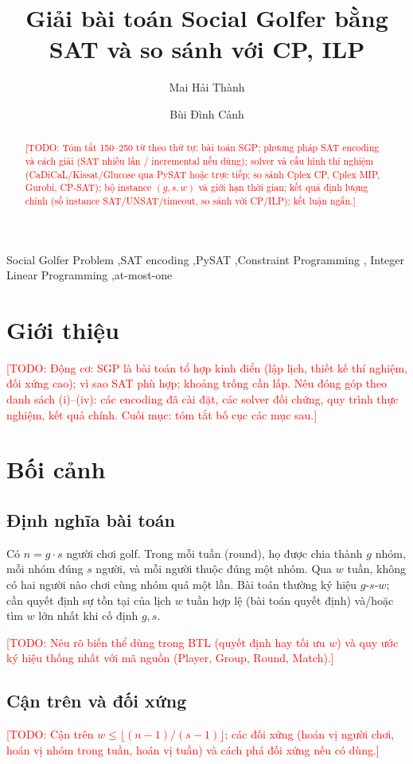 \documentclass[a4paper,fleqn]{cas-sc}
\title[mode=title]{Giải bài toán Social Golfer bằng SAT và so sánh với CP, ILP}
\author[1]{Mai Hải Thành}
\author[1]{Bùi Đình Cảnh}
\newcommand{\TODO}[1]{\textcolor{red}{[TODO: #1]}}
\begin{document}
\begin{abstract}
\TODO{Tóm tắt 150--250 từ theo thứ tự: bài toán SGP; phương pháp SAT encoding và
cách giải (SAT nhiều lần / incremental nếu dùng); solver và cấu hình thí nghiệm
(CaDiCaL/Kissat/Glucose qua PySAT hoặc trực tiếp; so sánh Cplex CP, Cplex MIP,
Gurobi, CP-SAT); bộ instance $(g,s,w)$ và giới hạn thời gian; kết quả định lượng
chính (số instance SAT/UNSAT/timeout, so sánh với CP/ILP); kết luận ngắn.}
\end{abstract}

\begin{keywords}
Social Golfer Problem \sep SAT encoding \sep PySAT \sep Constraint Programming \sep
Integer Linear Programming \sep at-most-one
\end{keywords}

\maketitle

\section{Giới thiệu}
\TODO{Động cơ: SGP là bài toán tổ hợp kinh điển (lập lịch, thiết kế thí nghiệm, đối
xứng cao); vì sao SAT phù hợp; khoảng trống cần lấp. Nêu đóng góp theo danh sách
(i)--(iv): các encoding đã cài đặt, các solver đối chứng, quy trình thực nghiệm,
kết quả chính. Cuối mục: tóm tắt bố cục các mục sau.}

\section{Bối cảnh}
\subsection{Định nghĩa bài toán}
Có $n = g\cdot s$ người chơi golf. Trong mỗi tuần (round), họ được chia thành $g$
nhóm, mỗi nhóm đúng $s$ người, và mỗi người thuộc đúng một nhóm. Qua $w$ tuần,
không có hai người nào chơi cùng nhóm quá một lần. Bài toán thường ký hiệu
$g$-$s$-$w$; cần quyết định sự tồn tại của lịch $w$ tuần hợp lệ (bài toán quyết
định) và/hoặc tìm $w$ lớn nhất khi cố định $g,s$.

\TODO{Nêu rõ biến thể dùng trong BTL (quyết định hay tối ưu $w$) và quy ước ký
hiệu thống nhất với mã nguồn (Player, Group, Round, Match).}

\subsection{Cận trên và đối xứng}
\TODO{Cận trên $w \le \lfloor (n-1)/(s-1) \rfloor$; các đối xứng (hoán vị người
chơi, hoán vị nhóm trong tuần, hoán vị tuần) và cách phá đối xứng nếu có dùng.}
\end{document}
